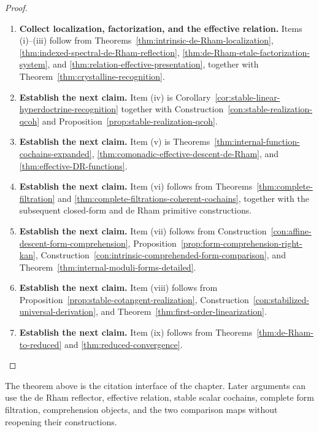 \begin{proof}
\leavevmode
\begin{enumerate}[label=\textup{(\arabic*)}]
    \item \textbf{Collect localization, factorization, and the effective relation.}
    Items \textup{(i)}--\textup{(iii)} follow from
    Theorems~\ref{thm:intrinsic-de-Rham-localization},
    \ref{thm:indexed-spectral-de-Rham-reflection},
    \ref{thm:de-Rham-etale-factorization-system}, and
    \ref{thm:relation-effective-presentation}, together with
    Theorem~\ref{thm:crystalline-recognition}.
    \item \textbf{Establish the next claim.}
    Item \textup{(iv)} is
    Corollary~\ref{cor:stable-linear-hyperdoctrine-recognition} together with
    Construction~\ref{con:stable-realization-qcoh} and
    Proposition~\ref{prop:stable-realization-qcoh}.
    \item \textbf{Establish the next claim.}
    Item \textup{(v)} is
    Theorems~\ref{thm:internal-function-cochains-expanded},
    \ref{thm:comonadic-effective-descent-de-Rham}, and
    \ref{thm:effective-DR-functions}.
    \item \textbf{Establish the next claim.}
    Item \textup{(vi)} follows from
    Theorems~\ref{thm:complete-filtration} and
    \ref{thm:complete-filtrations-coherent-cochains}, together with the subsequent
    closed-form and de Rham primitive constructions.
    \item \textbf{Establish the next claim.}
    Item \textup{(vii)} follows
    from Construction~\ref{con:affine-descent-form-comprehension},
    Proposition~\ref{prop:form-comprehension-right-kan},
    Construction~\ref{con:intrinsic-comprehended-form-comparison}, and
    Theorem~\ref{thm:internal-moduli-forms-detailed}.
    \item \textbf{Establish the next claim.}
    Item \textup{(viii)} follows from
    Proposition~\ref{prop:stable-cotangent-realization},
    Construction~\ref{con:stabilized-universal-derivation}, and
    Theorem~\ref{thm:first-order-linearization}.
    \item \textbf{Establish the next claim.}
    Item \textup{(ix)} follows from
    Theorems~\ref{thm:de-Rham-to-reduced} and
    \ref{thm:reduced-convergence}.
\end{enumerate}
\end{proof}



The theorem above is the citation interface of the chapter. Later arguments
can use the de Rham reflector, effective relation, stable scalar cochains,
complete form filtration, comprehension objects, and the two comparison maps
without reopening their constructions.

